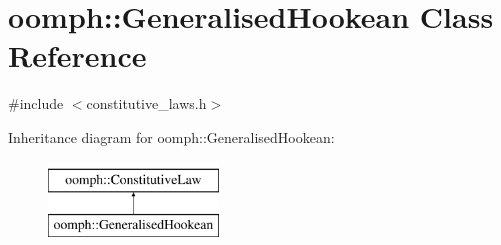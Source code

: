 \hypertarget{classoomph_1_1GeneralisedHookean}{}\section{oomph\+:\+:Generalised\+Hookean Class Reference}
\label{classoomph_1_1GeneralisedHookean}


{\ttfamily \#include $<$constitutive\+\_\+laws.\+h$>$}

Inheritance diagram for oomph\+:\+:Generalised\+Hookean\+:\begin{figure}[H]
\begin{center}
\leavevmode
\includegraphics[height=2.000000cm]{classoomph_1_1GeneralisedHookean}
\end{center}
\end{figure}
